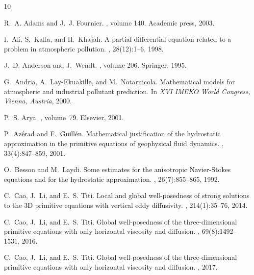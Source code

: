 \documentclass[11pt, a4paper]{article}
\begin{document}
\nocite{*}


\begin{thebibliography}{10}

R.~A. Adams and J.~J. Fournier.
, volume 140.
\newblock Academic press, 2003.

I.~Ali, S.~Kalla, and H.~Khajah.
\newblock A partial differential equation related to a problem in atmospheric pollution.
, 28(12):1--6, 1998.

J.~D. Anderson and J.~Wendt.
, volume 206.
\newblock Springer, 1995.

G.~Andria, A.~Lay-Ekuakille, and M.~Notarnicola.
\newblock Mathematical models for atmospheric and industrial pollutant prediction.
\newblock In {\em XVI IMEKO World Congress, Vienna, Austria}, 2000.

P.~S. Arya.
, volume~79.
\newblock Elsevier, 2001.

P.~Az{\'e}rad and F.~Guill{\'e}n.
\newblock Mathematical justification of the hydrostatic approximation in the primitive equations of geophysical fluid dynamics.
, 33(4):847--859, 2001.

O.~Besson and M.~Laydi.
\newblock Some estimates for the anisotropic Navier-Stokes equations and for the hydrostatic approximation.
, 26(7):855--865, 1992.

C.~Cao, J.~Li, and E.~S. Titi.
\newblock Local and global well-posedness of strong solutions to the 3D primitive equations with vertical eddy diffusivity.
, 214(1):35--76, 2014.

C.~Cao, J.~Li, and E.~S. Titi.
\newblock Global well-posedness of the three-dimensional primitive equations with only horizontal viscosity and diffusion.
, 69(8):1492--1531, 2016.

C.~Cao, J.~Li, and E.~S. Titi.
\newblock Global well-posedness of the three-dimensional primitive equations with only horizontal viscosity and diffusion.
, 2017.


\end{thebibliography}
\end{document}
